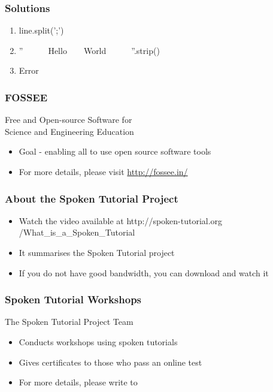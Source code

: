 \documentclass[17pt,compress]{beamer}
\begin{document}
\begin{frame}
\frametitle{Solutions}
\label{sec-11}


\begin{enumerate}
\item line.split(';')\pause
\item ''~~~~~~Hello~~~~World~~~~~~''.strip()\pause
\item Error
\end{enumerate}
\end{frame}
\begin{frame}
\frametitle{FOSSEE}
{\color{blue}Free and Open-source Software for \\Science and Engineering Education} \\
\begin{itemize}
\item Goal - enabling all to use open source software tools
\item For more details, please visit {\color{blue}\url{http://fossee.in/}}
\end{itemize}
\end{frame}
\begin{frame}
\frametitle{About the Spoken Tutorial Project}
\begin{itemize}
\item Watch the video available at {\color{blue}http://spoken-tutorial.org /What\_is\_a\_Spoken\_Tutorial}
\item It summarises the Spoken Tutorial project \pause
\item If you do not have good bandwidth, you can download and watch it
\end{itemize}
\end{frame}
\begin{frame}
\frametitle{Spoken Tutorial Workshops}The Spoken Tutorial Project Team 
\begin{itemize}
\item Conducts workshops using spoken tutorials 
\item Gives certificates to those who pass an online test 
\item For more details, please write to \\ 
\end{itemize}
\end{frame}
\end{document}
